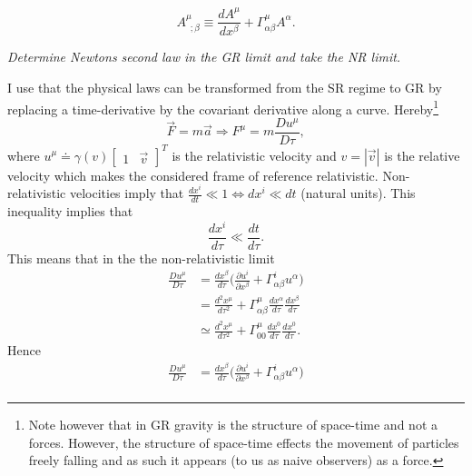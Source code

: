 \begin{equation}
	A^\mu_{\,\,\,;\beta}\equiv \frac{dA^\mu}{dx^\beta}+\Gamma^\mu_{\alpha\beta}A^\alpha.
\end{equation}
\begin{example}
	\emph{Determine Newtons second law in the GR limit and take the NR limit.}\newline
	
	I use that the physical laws can be transformed from the SR regime to GR by replacing a time-derivative by the covariant derivative along a curve. Hereby\footnote{Note however that in GR gravity is the structure of space-time and not a forces. However, the structure of space-time effects the movement of particles freely falling and as such it appears (to us as naive observers) as a force.}
	\begin{equation}
		\vec{F}=m\vec{a}\Rightarrow F^\mu=m\frac{Du^\mu}{D\tau},
	\end{equation}\normalsize
	where $u^\mu\doteq\gamma(v)\begin{bmatrix}
		1 & \vec{v}
	\end{bmatrix}^T$ is the relativistic velocity and $v=|\vec{v}|$ is the relative velocity which makes the considered frame of reference relativistic. Non-relativistic velocities imply that $\frac{dx^i}{dt}\ll 1\Leftrightarrow dx^i\ll dt$ (natural units). This inequality implies that
	\begin{equation}
		\frac{dx^i}{d\tau}\ll \frac{dt}{d\tau}.
	\end{equation}\normalsize
	This means that in the the non-relativistic limit
	\begin{equation}
		\begin{split}
			\frac{Du^\mu}{D\tau}&=\frac{d x^\beta}{d\tau}\bigg(\frac{\partial u^i}{\partial x^\beta}+\Gamma^i_{\alpha\beta}u^\alpha\bigg)\\
			&=\frac{d^2x^\mu}{d\tau ^2}+\Gamma^\mu_{\alpha\beta}\frac{dx^\alpha}{d\tau}\frac{dx^\beta}{d\tau}\\
			&\simeq \frac{d^2x^\mu}{d\tau ^2}+\Gamma^\mu_{00}\frac{dx^0}{d\tau}\frac{dx^0}{d\tau}.
		\end{split}
	\end{equation}\normalsize
	Hence
	\begin{equation}
		\begin{split}
			\frac{Du^\mu}{D\tau}&=\frac{d x^\beta}{d\tau}\bigg(\frac{\partial u^i}{\partial x^\beta}+\Gamma^i_{\alpha\beta}u^\alpha\bigg)\\

\end{split}
\end{equation}
\end{example}
